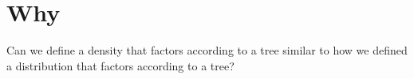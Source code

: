 

\section*{Why}

Can we define a density that factors according to a tree similar to how we defined a distribution that factors according to a tree?
